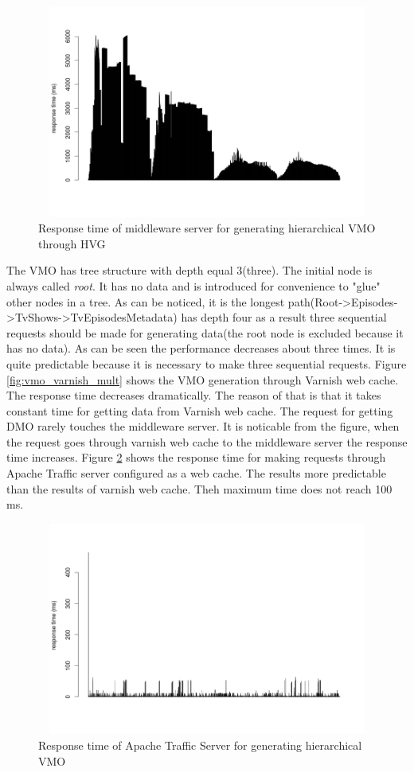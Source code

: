 \begin{figure}[h!]
    \centering
    \includegraphics[width=15cm,height=7cm,keepaspectratio]{images/vmo_hvg.png}
    \caption{Response time of middleware server for generating hierarchical VMO through HVG}
    \label{fig:vmo_hvg}
\end{figure}


The VMO has tree structure with depth equal 3(three). The initial node is always called \textit{root}. It has no data and is introduced for convenience to "glue" other nodes in a tree. As can be noticed, it is the longest path(Root->Episodes->TvShows->TvEpisodesMetadata) has depth four as a result three sequential requests should be made for generating data(the root node is excluded because it has no data). As can be seen the performance decreases about three times. It is quite predictable because it is necessary to make three sequential requests. Figure \ref{fig:vmo_varnish_mult} shows the VMO generation through Varnish web cache. The response time decreases dramatically. The reason of that is that it takes constant time for getting data from Varnish web cache. The request for getting DMO rarely touches the middleware server. It is noticable from the figure, when the request goes through varnish web cache to the middleware server the response time increases. Figure \ref{fig:vmo_ts_mult} shows the response time for making requests through Apache Traffic server configured as a web cache. The results more predictable than the results of varnish web cache. Theh maximum time does not reach 100 ms.  

\begin{figure}[h!]
    \centering
    \includegraphics[width=15cm,height=7cm,keepaspectratio]{images/vmo_ts_mult.png}
    \caption{Response time of Apache Traffic Server for generating hierarchical VMO}
    \label{fig:vmo_ts_mult}
\end{figure}

